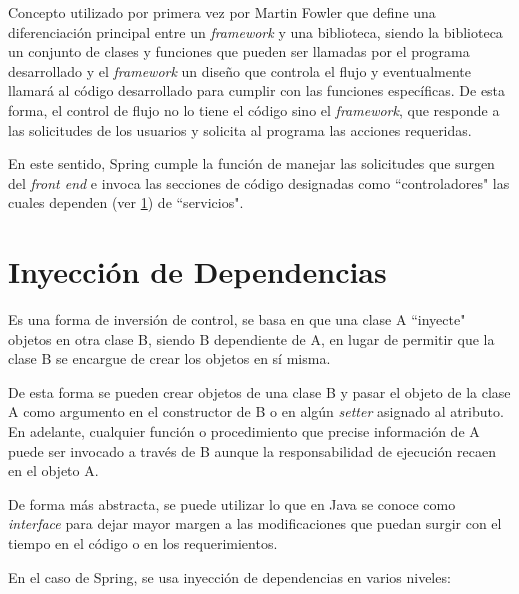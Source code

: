     Concepto utilizado por primera vez por Martin Fowler\cite{IOC-dgarcia} que define una diferenciación principal entre un \textit{framework} y una biblioteca, siendo la biblioteca un conjunto de clases y funciones que pueden ser llamadas por el programa desarrollado y el \textit{framework} un diseño que controla el flujo y eventualmente llamará al código desarrollado para cumplir con las funciones específicas. De esta forma, el control de flujo no lo tiene el código sino el \textit{framework}, que responde a las solicitudes de los usuarios y solicita al programa las acciones requeridas.
    
    En este sentido, Spring cumple la función de manejar las solicitudes que surgen del \textit{front end} e invoca las secciones de código designadas como ``controladores" las cuales dependen (ver \ref{teorico-di}) de ``servicios".
    
    \section{Inyección de Dependencias}
    \label{teorico-di}
    
    Es una forma de inversión de control, se basa en que una clase A ``inyecte" objetos en otra clase B, siendo B dependiente de A, en lugar de permitir que la clase B se encargue de crear los objetos en sí misma\cites{IOC-mpachano}{IOC-dgarcia}.
    
    De esta forma se pueden crear objetos de una clase B y pasar el objeto de la clase A como argumento en el constructor de B o en algún \textit{setter} asignado al atributo. En adelante, cualquier función o procedimiento que precise información de A puede ser invocado a través de B aunque la responsabilidad de ejecución recaen en el objeto A.
    
    De forma más abstracta, se puede utilizar lo que en Java se conoce como \textit{interface} para dejar mayor margen a las modificaciones que puedan surgir con el tiempo en el código o en los requerimientos.
    
    En el caso de Spring, se usa inyección de dependencias en varios niveles:
    
